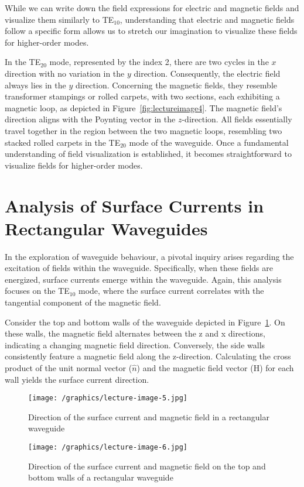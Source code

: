 While we can write down the field expressions for electric and magnetic fields and visualize them similarly to TE$_{10}$, understanding that electric and magnetic fields follow a specific form allows us to stretch our imagination to visualize these fields for higher-order modes.

In the TE$_{20}$ mode, represented by the index 2, there are two cycles in the $x$ direction with no variation in the $y$ direction. Consequently, the electric field always lies in the $y$ direction. Concerning the magnetic fields, they resemble transformer stampings or rolled carpets, with two sections, each exhibiting a magnetic loop, as depicted in Figure~\ref{fig:lectureimage4}. The magnetic field's direction aligns with the Poynting vector in the $z$-direction. All fields essentially travel together in the region between the two magnetic loops, resembling two stacked rolled carpets in the TE$_{20}$ mode of the waveguide. Once a fundamental understanding of field visualization is established, it becomes straightforward to visualize fields for higher-order modes.

\section{Analysis of Surface Currents in Rectangular Waveguides}
In the exploration of waveguide behaviour, a pivotal inquiry arises regarding the excitation of fields within the waveguide. Specifically, when these fields are energized, surface currents emerge within the waveguide. Again,  this analysis focuses on the TE$_{10}$ mode, where the surface current correlates with the tangential component of the magnetic field.

Consider the top and bottom walls of the waveguide depicted in Figure~\ref{fig:lectureimage5}. On these walls, the magnetic field alternates between the z and x directions, indicating a changing magnetic field direction. Conversely, the side walls consistently feature a magnetic field along the z-direction. Calculating the cross product of the unit normal vector ($\hat{n}$) and the magnetic field vector (H) for each wall yields the surface current direction.
\begin{figure}[h]
\centering
\texttt{[image: /graphics/lecture-image-5.jpg]}
\caption{Direction of the surface current and magnetic field in a rectangular waveguide}
\label{fig:lectureimage5}
\end{figure}
\begin{figure}[h]
\centering
\texttt{[image: /graphics/lecture-image-6.jpg]}
\caption{Direction of the surface current and magnetic field on the top and bottom walls of a rectangular waveguide}
\label{fig:lectureimage6}
\end{figure}

